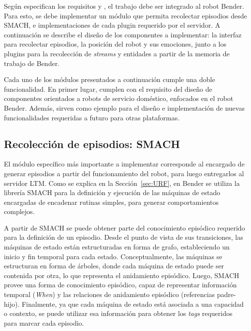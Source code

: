 Según especifican los requisitos  y , el trabajo debe ser integrado al robot Bender. Para esto, se debe implementar un módulo que permita recolectar episodios desde SMACH, e implementaciones de cada plugin requerido por el servidor. A continuación se describe el diseño de los componentes a implementar: la interfaz para recolectar episodios, la posición del robot y sus emociones, junto a los plugins para la recolección de \textit{streams} y entidades a partir de la memoria de trabajo de Bender. 

Cada uno de los módulos presentados a continuación cumple una doble funcionalidad. En primer lugar, cumplen con el requisito del diseño de componentes orientados a robots de servicio doméstico, enfocados en el robot Bender. Además, sirven como ejemplo para el diseño e implementación de nuevas funcionalidades requeridas a futuro para otras plataformas.

\subsection{Recolección de episodios: SMACH}

El módulo específico más importante a implementar corresponde al encargado de generar episodios a partir del funcionamiento del robot, para luego entregarlos al servidor LTM. Como se explica en la Sección~\ref{sec:URF}, en Bender se utiliza la librería SMACH para la definición y ejecución de las máquinas de estado encargadas de encadenar rutinas simples, para generar comportamientos complejos.

A partir de SMACH se puede obtener parte del conocimiento episódico requerido para la definición de un episodio. Desde el punto de vista de sus transiciones, las máquinas de estado están estructuradas en forma de grafo, estableciendo un inicio y fin temporal para cada estado. Conceptualmente, las máquinas se estructuran en forma de árboles, donde cada máquina de estado puede ser contenida por otra, lo que representa el anidamiento episódico. Luego, SMACH provee una forma de conocimiento episódico, capaz de representar información temporal (\textit{When}) y las relaciones de anidamiento episódico (referencias padre-hijo). Finalmente, ya que cada máquina de estado está asociada a una capacidad o contexto, se puede utilizar esa información para obtener los \textit{tags} requeridos para marcar cada episodio.

